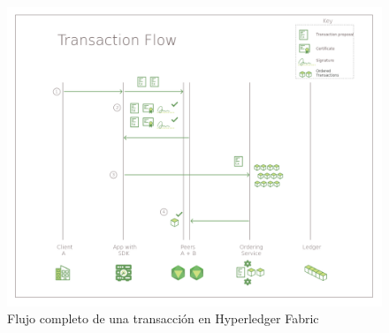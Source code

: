 \begin{figure}[h]
	\includegraphics[width=\linewidth]{Graphics/txflow.png}
	\caption{Flujo completo de una transacción en Hyperledger Fabric}
	\label{fig:4}
\end{figure}

